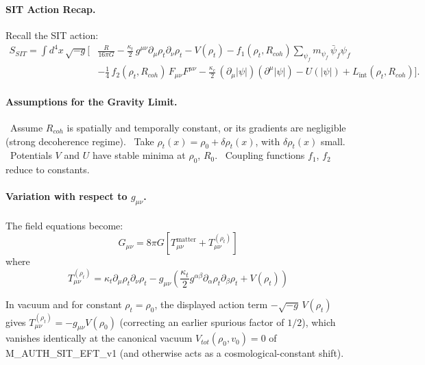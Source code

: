 \documentclass[american,11pt,letterpaper]{article}
\def\mathcal#1{#1}%
\def\mathrm#1{#1}%
\def\texttt#1{#1}%
\begin{document}
\paragraph{SIT Action Recap.}
Recall the SIT action:
\begin{align*}
S_{\mathrm{SIT}} = \int d^4x\,\sqrt{-g}\Bigg[
    &\frac{R}{16\pi G}
    - \frac{\kappa_t}{2}\,g^{\mu\nu}\partial_\mu\rho_t\partial_\nu\rho_t - V(\rho_t)
    - f_1(\rho_t, R_{\mathrm{coh}})\sum_{\psi_f} m_{\psi_f}\,\bar\psi_f\psi_f \\
    &- \frac{1}{4}\,f_2(\rho_t, R_{\mathrm{coh}})\,F_{\mu\nu}F^{\mu\nu}
    - \frac{\kappa_c}{2}\,(\partial_\mu |\psi|)(\partial^\mu |\psi|) - U(|\psi|)
    + \mathcal{L}_{\text{int}}(\rho_t, R_{\mathrm{coh}})
\Bigg].
\end{align*}

\paragraph{Assumptions for the Gravity Limit.}
\noindent\textbullet~Assume $R_{\mathrm{coh}}$ is spatially and temporally constant, or its gradients are negligible (strong decoherence regime).
\noindent\textbullet~Take $\rho_t(x) = \rho_0 + \delta \rho_t(x)$, with $\delta \rho_t(x)$ small.
\noindent\textbullet~Potentials $V$ and $U$ have stable minima at $\rho_0$, $R_0$.
\noindent\textbullet~Coupling functions $f_1$, $f_2$ reduce to constants.

\paragraph{Variation with respect to $g_{\mu\nu}$.}
The field equations become:
\[
G_{\mu\nu} = 8\pi G \left[ T_{\mu\nu}^{\text{matter}} + T_{\mu\nu}^{(\rho_t)} \right]
\]
where
\[
T_{\mu\nu}^{(\rho_t)} = \kappa_t \partial_\mu \rho_t \partial_\nu \rho_t - g_{\mu\nu} \left( \frac{\kappa_t}{2} g^{\alpha\beta} \partial_\alpha \rho_t \partial_\beta \rho_t + V(\rho_t) \right)
\]

In vacuum and for constant $\rho_t = \rho_0$, the displayed action term $-\sqrt{-g}\,V(\rho_t)$ gives $T_{\mu\nu}^{(\rho_t)} = -g_{\mu\nu} V(\rho_0)$ (correcting an earlier spurious factor of $1/2$), which vanishes identically at the canonical vacuum $V_{\mathrm{tot}}(\rho_0, v_0) = 0$ of \texttt{M\_AUTH\_SIT\_EFT\_v1} (and otherwise acts as a cosmological-constant shift).
\end{document}
